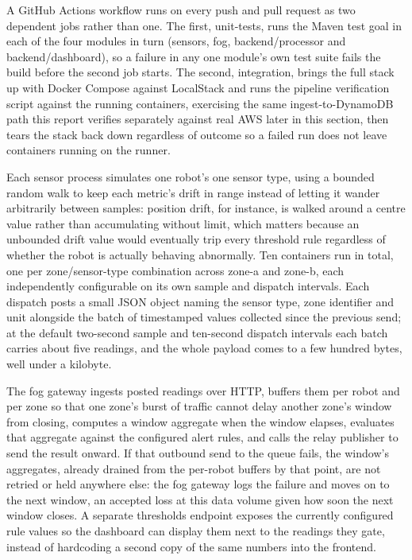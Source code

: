 \documentclass[conference]{IEEEtran}
\begin{document}
A GitHub Actions workflow runs on every push and pull request as two dependent jobs rather than one. The first, unit-tests, runs the Maven test goal in each of the four modules in turn (sensors, fog, backend/processor and backend/dashboard), so a failure in any one module's own test suite fails the build before the second job starts. The second, integration, brings the full stack up with Docker Compose against LocalStack and runs the pipeline verification script against the running containers, exercising the same ingest-to-DynamoDB path this report verifies separately against real AWS later in this section, then tears the stack back down regardless of outcome so a failed run does not leave containers running on the runner.

Each sensor process simulates one robot's one sensor type, using a bounded random walk to keep each metric's drift in range instead of letting it wander arbitrarily between samples: position drift, for instance, is walked around a centre value rather than accumulating without limit, which matters because an unbounded drift value would eventually trip every threshold rule regardless of whether the robot is actually behaving abnormally. Ten containers run in total, one per zone/sensor-type combination across zone-a and zone-b, each independently configurable on its own sample and dispatch intervals. Each dispatch posts a small JSON object naming the sensor type, zone identifier and unit alongside the batch of timestamped values collected since the previous send; at the default two-second sample and ten-second dispatch intervals each batch carries about five readings, and the whole payload comes to a few hundred bytes, well under a kilobyte.

The fog gateway ingests posted readings over HTTP, buffers them per robot and per zone so that one zone's burst of traffic cannot delay another zone's window from closing, computes a window aggregate when the window elapses, evaluates that aggregate against the configured alert rules, and calls the relay publisher to send the result onward. If that outbound send to the queue fails, the window's aggregates, already drained from the per-robot buffers by that point, are not retried or held anywhere else: the fog gateway logs the failure and moves on to the next window, an accepted loss at this data volume given how soon the next window closes. A separate thresholds endpoint exposes the currently configured rule values so the dashboard can display them next to the readings they gate, instead of hardcoding a second copy of the same numbers into the frontend.
\end{document}

